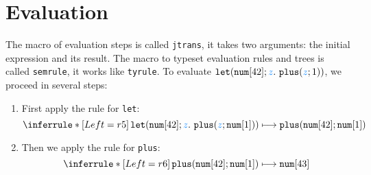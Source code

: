 \documentclass[11pt]{article}
\begin{document}
\section{Evaluation}

The macro of evaluation steps is called \texttt{jtrans}, it takes two
arguments: the initial expression and its result.
% 
The macro to typeset evaluation rules and trees is called
\texttt{semrule}, it works like \texttt{tyrule}.
%
To evaluate $\elet{\enum{42}}{z}{\eplus{\var{z}}{1}}$, we proceed in
several steps:

\begin{enumerate}
\item First apply the rule for \texttt{let}:
  \[
  \semrule
  {r5}
  {\,}
  {
    \jtrans
    {\elet{\enum{42}}{z}{\eplus{\var{z}}{\enum{1}}}}
    {
      {\eplus{\enum{42}}{\enum{1}}}
    }
  }
  \]
\item Then we apply the rule for \texttt{plus}:
  \[
  \semrule
  {r6}
  {\,}
  {\jtrans
    {\eplus{\enum{42}}{\enum{1}}}
    {\enum{43}}
  }
  \]
\end{enumerate}
\end{document}
